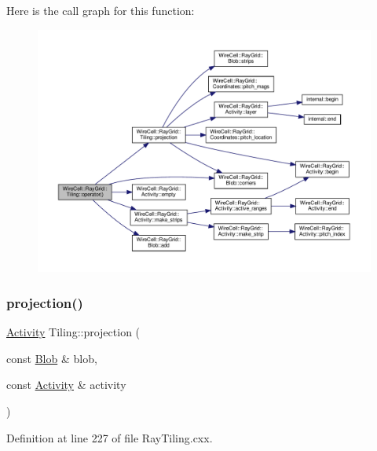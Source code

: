 Here is the call graph for this function\+:
\nopagebreak
\begin{figure}[H]
\begin{center}
\leavevmode
\includegraphics[width=350pt]{class_wire_cell_1_1_ray_grid_1_1_tiling_a1f7992b6111368304757bd5bab3346e0_cgraph}
\end{center}
\end{figure}
\mbox{\label{class_wire_cell_1_1_ray_grid_1_1_tiling_a621e1fdb35b900f3eb6dcd2e933b40d9}} 
\subsubsection{\texorpdfstring{projection()}{projection()}}
{\footnotesize\ttfamily \hyperlink{class_wire_cell_1_1_ray_grid_1_1_activity}{Activity} Tiling\+::projection (\begin{DoxyParamCaption}\item[{const \hyperlink{class_wire_cell_1_1_ray_grid_1_1_blob}{Blob} \&}]{blob,  }\item[{const \hyperlink{class_wire_cell_1_1_ray_grid_1_1_activity}{Activity} \&}]{activity }\end{DoxyParamCaption})}



Definition at line 227 of file Ray\+Tiling.\+cxx.

